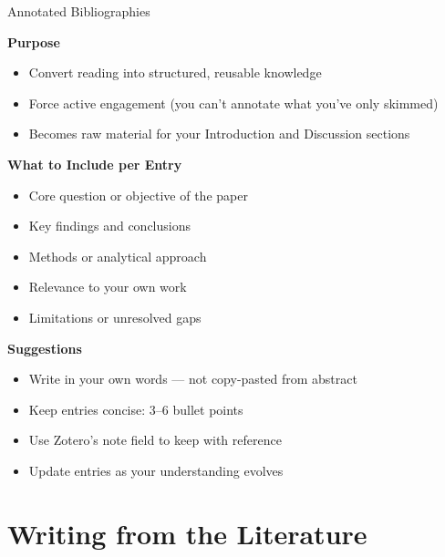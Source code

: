 \documentclass{beamer}
\begin{document}
\begin{frame}{Annotated Bibliographies}

  \footnotesize
  \textbf{Purpose}
  \begin{itemize}
    \item Convert reading into structured, reusable knowledge
    \item Force active engagement
    {\scriptsize (you can't annotate what you've only skimmed)}
    \item Becomes raw material for your Introduction and
      Discussion sections
  \end{itemize}

  \medskip
  \textbf{What to Include per Entry}
  \begin{itemize}
    \item Core question or objective of the paper
    \item Key findings and conclusions
    \item Methods or analytical approach
    \item Relevance to your own work
    \item Limitations or unresolved gaps
  \end{itemize}

  \medskip
  \textbf{Suggestions}
  \begin{itemize}
    \item Write in your own words --- not copy-pasted from abstract
    \item Keep entries concise: 3--6 bullet points
    \item Use Zotero's note field to keep with reference
    \item Update entries as your understanding evolves
  \end{itemize}

\end{frame}


\section{Writing from the Literature}
\end{document}
